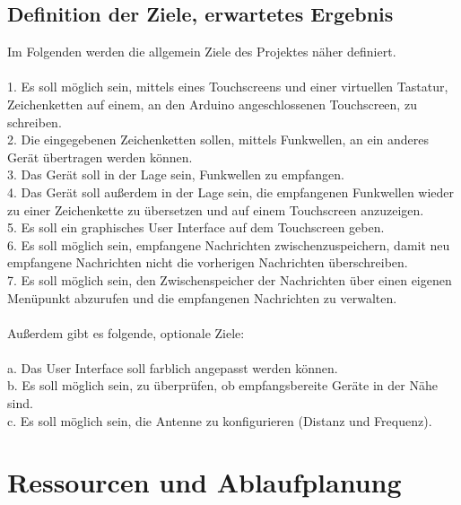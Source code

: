 \documentclass[a4paper, 11pt]{scrartcl}
\begin{document}
\subsection{Definition der Ziele, erwartetes Ergebnis}
Im Folgenden werden die allgemein Ziele des Projektes näher definiert.
\\
\\
1. Es soll möglich sein, mittels eines Touchscreens und einer virtuellen Tastatur, Zeichenketten auf einem, an den Arduino angeschlossenen Touchscreen, zu schreiben.
\\
2. Die eingegebenen Zeichenketten sollen, mittels Funkwellen, an ein anderes Gerät übertragen werden können.
\\
3. Das Gerät soll in der Lage sein, Funkwellen zu empfangen.
\\
4. Das Gerät soll außerdem in der Lage sein, die empfangenen Funkwellen wieder zu einer Zeichenkette zu übersetzen und auf einem Touchscreen anzuzeigen.
\\
5. Es soll ein graphisches User Interface auf dem Touchscreen geben.
\\
6. Es soll möglich sein, empfangene Nachrichten zwischenzuspeichern, damit neu empfangene Nachrichten nicht die vorherigen Nachrichten überschreiben.
\\
7. Es soll möglich sein, den Zwischenspeicher der Nachrichten über einen eigenen Menüpunkt abzurufen und die empfangenen Nachrichten zu verwalten.
\\
\\
Außerdem gibt es folgende, optionale Ziele:
\\
\\
a. Das User Interface soll farblich angepasst werden können.
\\
b. Es soll möglich sein, zu überprüfen, ob empfangsbereite Geräte in der Nähe sind.
\\
c. Es soll möglich sein, die Antenne zu konfigurieren (Distanz und Frequenz).


\section{Ressourcen und Ablaufplanung}
\end{document}

